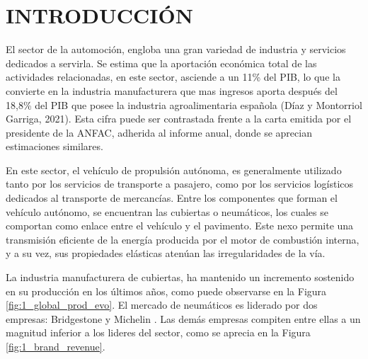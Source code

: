 
\section{INTRODUCCIÓN}

El sector de la automoción,
engloba una gran variedad de industria y servicios dedicados a servirla.
Se estima que la aportación económica total de las actividades relacionadas,
en este sector, asciende a un 11\% del PIB,
lo que la convierte en la industria manufacturera que mas ingresos aporta
después  del 18,8\% del PIB que posee la industria agroalimentaria española
(Díaz y Montorriol Garriga, 2021).
Esta cifra puede ser contrastada
frente a la carta emitida por el presidente de la ANFAC,
adherida al informe anual,
donde se aprecian estimaciones similares.

En este sector, el vehículo de propulsión autónoma,
es generalmente utilizado tanto por los servicios de transporte a pasajero,
como por los servicios logísticos dedicados al transporte de mercancías.
Entre los componentes que forman el vehículo autónomo,
se encuentran las cubiertas o neumáticos,
los cuales se comportan como enlace entre el vehículo y el pavimento.
Este nexo permite una transmisión eficiente
de la energía producida por el motor de combustión interna,
y a su vez, sus propiedades elásticas atenúan las irregularidades de la vía.

La industria manufacturera de cubiertas,
ha mantenido un incremento sostenido en su producción en los últimos años,
como puede observarse en la Figura \ref{fig:1_global_prod_evo}.
El mercado de neumáticos es liderado por dos empresas: Bridgestone y Michelin
\citep{rodgers2020tire}.
Las demás empresas compiten entre ellas
a un magnitud inferior a los lideres del sector,
como se aprecia en la Figura \ref{fig:1_brand_revenue}.

